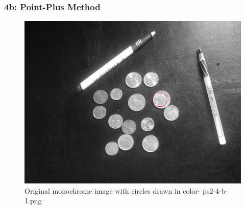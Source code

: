     \begin{frame}
		\frametitle{4b: Point-Plus Method}
		
		\begin{figure}[!htb]
			\centering
			\includegraphics[height=0.65\textheight]{./output/ps2-4-b-1.png}
			\caption{Original monochrome image with circles drawn in color- ps2-4-b-1.png} 
		\end{figure}	
		
	\end{frame}

